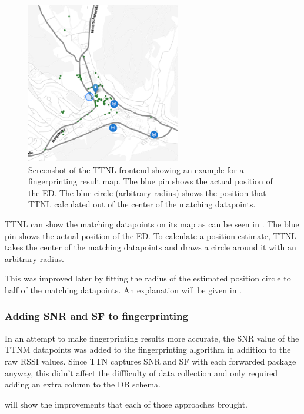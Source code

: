\begin{figure}[htbp]
    \centering
    \includegraphics[width=0.6\textwidth]{pictures/ttn-locator/frontend/fingerprinting/rssi_similarity_map_example.png}
    \caption[Screenshot of the \acl{TTNL} frontend showing an example for a fingerprinting result map]{
        Screenshot of the \ac{TTNL} frontend showing an example for a fingerprinting result map.
        The blue pin shows the actual position of the \acl{ED}.
        The blue circle (arbitrary radius) shows the position that \ac{TTNL} calculated out of the center of the matching datapoints.
    }\label{fig:fingerprinting-map-example-only-center}
\end{figure}

\ac{TTNL} can show the matching datapoints on its map as can be seen in .
The blue pin shows the actual position of the \acl{ED}.
To calculate a position estimate, \ac{TTNL} takes the center of the matching datapoints and draws a circle around it with an arbitrary radius.

This was improved later by fitting the radius of the estimated position circle to half of the matching datapoints.
An explanation will be given in .

\subsubsection{Adding \acl{SNR} and \acl{SF} to fingerprinting}\label{sec:adding-snr-to-fingerprinting}

In an attempt to make fingerprinting results more accurate, the \ac{SNR} value of the \ac{TTNM} datapoints was added to the fingerprinting algorithm in addition to the raw \ac{RSSI} values.
Since \ac{TTN} captures \ac{SNR} and \ac{SF} with each forwarded package anyway, this didn't affect the diffficulty of data collection and only required adding an extra column to the \ac{DB} schema.

 will show the improvements that each of those approaches brought.